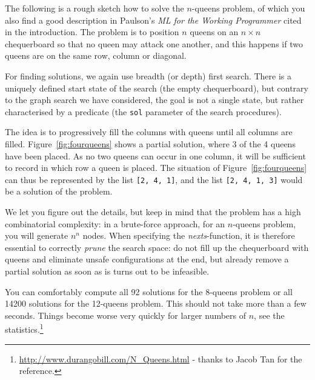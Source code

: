 \documentclass[english]{article}
\begin{document}
The following is a rough sketch how to solve the $n$-queens problem, of which
you also find a good description in Paulson's \emph{ML for the Working
  Programmer} cited in the introduction. The problem is to position $n$ queens on
an $n \times n$ chequerboard so that no queen may attack one another, and this
happens if two queens are on the same row, column or diagonal. 

For finding  solutions, we again use breadth (or depth) first search. There is
a uniquely defined start state of the search (the empty chequerboard), but
contrary to the graph search we have considered, the goal is not a single
state, but rather characterised by a predicate (the \texttt{sol} parameter of
the search procedures).

The idea is to progressively fill the columns with queens until all columns
are filled. Figure~\ref{fig:fourqueens} shows a partial solution, where 3 of
the 4 queens have been placed. As no two queens can occur in one column, it
will be sufficient to record in which row a queen is placed. The situation of
Figure~\ref{fig:fourqueens} can thus be represented by the list \texttt{[2, 4,
  1]}, and the list \texttt{[2, 4, 1, 3]} would be a solution of the problem. 

We let you figure out the details, but keep in mind that the problem has a
high combinatorial complexity: in a brute-force approach, for an $n$-queens
problem, you will generate $n^n$ nodes. When specifying the
\emph{nexts}-function, it is therefore essential to correctly \emph{prune} the
search space: do not fill up the chequerboard with queens and eliminate unsafe
configurations at the end, but already remove a partial solution as soon as is
turns out to be infeasible.

You can comfortably compute all 92 solutions for the 8-queens problem or all
14200 solutions for the 12-queens problem. This should not take more than a
few seconds. Things become worse very quickly for larger numbers of $n$, see
the statistics.\footnote{\url{http://www.durangobill.com/N_Queens.html} - thanks to Jacob Tan for the reference.}
\end{document}
